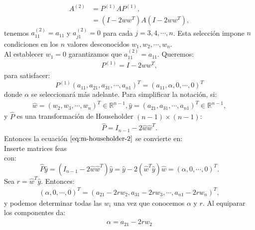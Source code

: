 \begin{align*}
  A^{(2)}&=P^{(1)}AP^{(1)},\\
  &=(I-2ww^T)A(I-2ww^T),
\end{align*}
tenemos $a_{11}^{(2)}=a_{11}$ y $a_{j1}^{(2)}=0$ para cada $j=3,4,\cdots,n$. Esta selección impone $n$ condiciones en los $n$ valores desconocidos $w_1,w_2,\cdots,w_n$.\\
Al establecer $w_1=0$ garantizamos que $a_{11}^{(2)}=a_{11}$. Queremos:
\begin{align*}
  P^{(1)}=I-2ww^T,
\end{align*}
para satisfacer:
\begin{equation}\label{eq:m-householder-2}
  P^{(1)}(a_{11},a_{21},a_{31},\cdots,a_{n1})^{T}=(a_{11},\alpha,0,\cdots,0)^T
\end{equation}
donde $\alpha$ se seleccionará más adelante. Para simplificar la notación, si:
\begin{align*}
  \hat{w}=(w_2,w_3,\cdots,w_n)^{T}\in\mathbb{R}^{n-1}, \hat{y}=(a_{21},a_{31},\cdots,a_{n1})^{T}\in\mathbb{R}^{n-1},  
\end{align*}
y $\hat{P}$ es una transformación de Householder $(n-1)\times(n-1)$:
\begin{align*}
  \hat{P}=I_{n-1}-2\hat{w}\hat{w}^T.
\end{align*}
Entonces la ecuación $\ref{eq:m-householder-2}$ se convierte en:\\
Inserte matrices feas\\ 
con:
\begin{equation}
  \hat{P}\hat{y}=(I_{n-1}-2\hat{w}\hat{w}^T)\hat{y}=\hat{y}-2(\hat{w}^T\hat{y})\hat{w}=(\alpha,0,\cdots,0)^T.
\end{equation}
Sea $r=\hat{w}^T\hat{y}$. Entonces:
\begin{align*}
  (\alpha,0,\cdots,0)^{T}=(a_{21}-2rw_2,a_{31}-2rw_3,\cdots,a_{n1}-2rw_n)^T,
\end{align*}
y podemos determinar todas las $w_i$ una vez que conocemos $\alpha$ y $r$. Al equiparar los componentes da:
\begin{align*}
  \alpha=a_{21}-2rw_2
\end{align*}



















